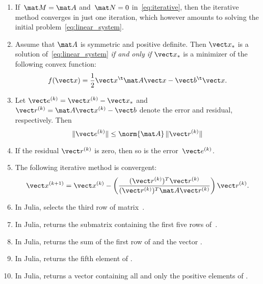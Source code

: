 \documentclass{article}
\begin{document}
\begin{enumerate}
    \item
        If~$\mat M = \mat A$ and~$\mat N = 0$ in~\eqref{eq:iterative},
        then the iterative method converges in just one iteration,
        which however amounts to solving the initial problem~\eqref{eq:linear_system}.

    \item
        Assume that $\mat A$ is symmetric and positive definite.
        Then $\vect x_*$ is a solution of~\eqref{eq:linear_system} \emph{if and only if}
        $\vect x_*$ is a minimizer of the following convex function:
        \[
            f(\vect x) = \frac{1}{2} \vect x^\t \mat A \vect x - \vect b^\t \vect x.
        \]

    \item
        Let $\vect e^{(k)} = \vect x^{(k)} - \vect x_*$ and $\vect r^{(k)} = \mat A \vect x^{(k)} - \vect b$ denote the error and residual,
        respectively.
        Then
        \[
            \lVert \vect e^{(k)} \rVert 
            \le
             \norm{\mat A} \, \lVert \vect r^{(k)} \rVert
        \]

    \item
        If the residual $\vect r^{(k)}$ is zero,
        then so is the error~$\vect e^{(k)}$. 

    \item
        The following iterative method is convergent:
        \begin{equation}
            \label{eq:iterative}
            \vect x^{(k+1)} = \vect x^{(k)} - \left( \frac{(\vect r^{(k)})^T \vect r^{(k)}}{(\vect r^{(k)})^T \mat A \vect r^{(k)}}\right)
            \vect r^{(k)}.
        \end{equation}

    \item
        In Julia,  selects the third row of matrix~.

    \item
        In Julia,  returns the submatrix containing the first five rows of~.

    \item
        In Julia,  returns the sum of the first row of  and the vector .

    \item
        In Julia,  returns the fifth element of .

    \item
        In Julia,  returns a vector containing all and only the positive elements of .
\end{enumerate}
\end{document}
